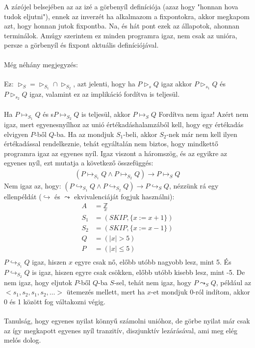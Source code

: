 \documentclass{article}
\begin{document}
A zárójel belsejében az az izé a görbenyíl definíciója (azaz hogy "honnan hova tudok eljutni"), ennek az inverzét ha alkalmazom a fixpontokra, akkor megkapom azt, hogy honnan jutok fixpontba. Na, és hát pont ezek az állapotok, ahonnan terminálok. Amúgy szerintem ez minden programra igaz, nem csak az unióra, persze a görbenyíl és fixpont aktuális definíciójával.
\\\\
Még néhány megjegyzés:
\\\\
Ez: $\triangleright_S = \triangleright_{S_1} \cap \triangleright_{S_2}$, azt jelenti, hogy ha $P\triangleright_sQ$ igaz akkor $P\triangleright_{s_1}Q$ és $P\triangleright_{s_2}Q$ igaz, valamint ez az implikáció fordítva is teljesül.
\\\\
Ha $P\mapsto_{S_1}Q$ és s$P\mapsto_{S_2}Q$ is teljesül, akkor $P\mapsto_SQ$ Fordítva nem igaz! Azért nem igaz, mert egyenesnyílhoz az unió értékadáshalamzából kell, hogy egy értékadás elvigyen $P$-ből $Q$-ba. Ha az mondjuk $S_1$-beli, akkor $S_2$-nek már nem kell ilyen értékadással rendelkeznie, tehát egyáltalán nem biztos, hogy mindkettő programra igaz az egyenes nyíl. Igaz viszont a háromszög, és az egyikre az egyenes nyíl, ezt mutatja a következő összefüggés:
\begin{align*}
(P\mapsto_{S_1}Q \land P\mapsto_{S_2}Q) \rightarrow P \mapsto_S Q
\end{align*}
Nem igaz az, hogy: $(P\hookrightarrow_{S_1}Q \land P\hookrightarrow_{S_2}Q) \rightarrow P \hookrightarrow_S Q$, nézzünk rá egy ellenpéldát ($\hookrightarrow$ és $\leadsto$ ekvivalenciáját fogjuk használni):
\begin{align*}
A &= \underset{x}{\mathbb{Z}}\\
S_1 &= (SKIP, \lbrace x:=x+1 \rbrace)\\
S_2 &= (SKIP, \lbrace x:=x-1 \rbrace)\\
Q &= (|x| > 5)\\
P &= (|x| \leq 5)\\
\end{align*}
$P \hookrightarrow_{S_1} Q$ igaz, hiszen $x$ egyre csak nő, előbb utóbb nagyobb lesz, mint 5. És $P \hookrightarrow_{S_2} Q$ is igaz, hiszen egyre csak csökken, előbb utóbb kisebb lesz, mint -5. De nem igaz, hogy eljutok $P$-ből $Q$-ba $S$-sel, tehát nem igaz, hogy $P\leadsto_S Q$, például az $<s_1, s_2, s_1, s_2, \dots>$ ütemezés mellett, mert ha $x$-et mondjuk 0-ról indítom, akkor 0 és 1 között fog váltakozni végig.\\\\
Tanulság, hogy egyenes nyilat könnyű számolni unióhoz, de görbe nyilat már csak az így megkapott egyenes nyíl tranzitív, diszjunktív lezárásával, ami meg elég melós dolog.
\end{document}

